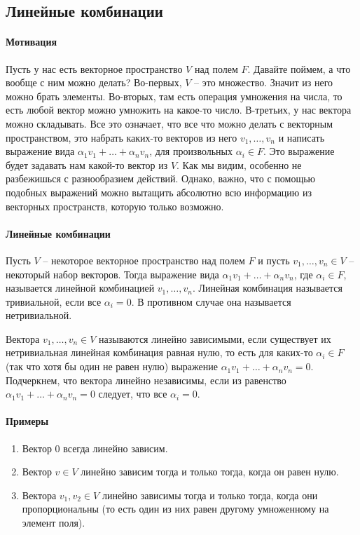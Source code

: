 \subsection{Линейные комбинации}

\paragraph{Мотивация}
Пусть у нас есть векторное пространство $V$ над полем $F$. Давайте поймем, а что вообще с ним можно делать? Во-первых, $V$ -- это множество. Значит из него можно брать элементы. Во-вторых, там есть операция умножения на числа, то есть любой вектор можно умножить на какое-то число. В-третьих, у нас вектора можно складывать. Все это означает, что все что можно делать с векторным пространством, это набрать каких-то векторов из него $v_1,\ldots,v_n$ и написать выражение вида $\alpha_1 v_1 + \ldots + \alpha_n v_n$, для произвольных $\alpha_i\in F$. Это выражение будет задавать нам какой-то вектор из $V$. Как мы видим, особенно не разбежишься с разнообразием действий. Однако, важно, что с помощью подобных выражений можно вытащить абсолютно всю информацию из векторных пространств, которую только возможно. 

\paragraph{Линейные комбинации}

Пусть $V$ -- некоторое векторное пространство над полем $F$ и пусть $v_1,\ldots,v_n\in V$ -- некоторый набор векторов. Тогда выражение вида $\alpha_1 v_1 +\ldots + \alpha_n v_n$, где $\alpha_i\in F$, называется линейной комбинацией $v_1,\ldots,v_n$. Линейная комбинация называется тривиальной, если все $\alpha_i = 0$. В противном случае она называется нетривиальной.

Вектора $v_1,\ldots,v_n\in V$ называются линейно зависимыми, если существует их нетривиальная линейная комбинация равная нулю, то есть для каких-то $\alpha_i\in F$ (так что хотя бы один не равен нулю) выражение $\alpha_1 v_1+\ldots + \alpha_n v_n = 0$. Подчеркнем, что вектора линейно независимы, если из равенство $\alpha_1 v_1 + \ldots + \alpha_n v_n = 0$ следует, что все $\alpha_i = 0$.

\paragraph{Примеры}
\begin{enumerate}
\item Вектор $0$ всегда линейно зависим.

\item Вектор $v\in V$ линейно зависим тогда и только тогда, когда он равен нулю.

\item Вектора $v_1, v_2 \in V$ линейно зависимы тогда и только тогда, когда они пропорциональны (то есть один из них равен другому умноженному на элемент поля).
\end{enumerate}

